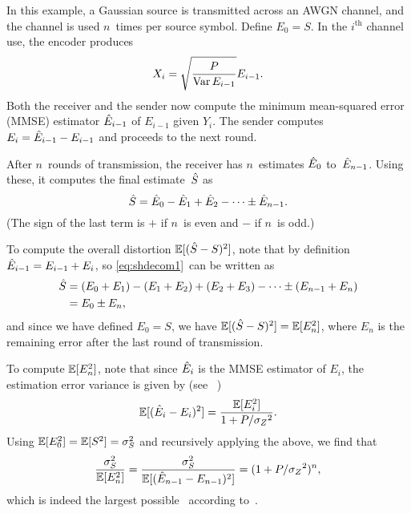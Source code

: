 \begin{example}
  \label{ex:gaussfb}
  In this example, a Gaussian source is transmitted across an AWGN channel, and
  the channel is used $n$~times per source symbol.  Define $E_0 = S$. In the
  $i^{\text{th}}$ channel use, the encoder produces
  \begin{equation}
    \label{eq:gaussfbxi}
    X_i = \sqrt{\frac{P}{\operatorname{Var} E_{i-1}}} E_{i-1}.
  \end{equation}
  Both the receiver and the sender now compute the minimum mean-squared
  error (MMSE) estimator $\hat{E}_{i-1}$ of $E_{i-1}$ given $Y_i$. The sender
  computes $E_i = \hat{E}_{i-1} - E_{i-1}$ and proceeds to the next round.

  After $n$~rounds of transmission, the receiver has $n$~estimates $\hat{E}_0$
  to~$\hat{E}_{n-1}$. Using these, it computes the final estimate~${\hat{S}}$ as
  \begin{equation}
    \label{eq:shdecom1}
    {\hat{S}} = \hat{E}_0 - \hat{E}_1 + \hat{E}_2 - \cdots \pm \hat{E}_{n-1}.
  \end{equation}
  (The sign of the last term is $+$ if $n$~is even and $-$ if $n$~is odd.)

  To compute the overall distortion ${\mathbb{E}[({\hat{S}} - S)^2]}$, note that by definition $\hat{E}_{i-1} =
  E_{i-1} + E_i$, so \eqref{eq:shdecom1}~can be written as
  \begin{align*}
    {\hat{S}} &= (E_0 + E_1) - (E_1 + E_2) + (E_2 + E_3) - \cdots \pm (E_{n-1} + E_n)
    \\
    &= E_0 \pm E_n,
  \end{align*}
  and since we have defined $E_0 = S$, we have ${\mathbb{E}[({\hat{S}} - S)^2]} = \mathbb{E}[E_n^2]$, where $E_n$
  is the remaining error after the last round of transmission.

  To compute $\mathbb{E}[E_n^2]$, note that since $\hat{E}_i$ is the MMSE estimator of
  $E_i$, the estimation error variance is given by (see
  \eg~\cite[Section~8.3]{Scharf1990})
  \begin{equation}
    \label{eq:gaussvardec}
    \mathbb{E}[(\hat{E}_i - E_i)^2] = \frac{\mathbb{E}[E_i^2]}{1 + P/{{\sigma_Z}^2}}.
  \end{equation}
  Using $\mathbb{E}[E_0^2] = \mathbb{E}[S^2] = {\sigma_S^2}$ and recursively applying the above, we find
  that
  \begin{equation*}
    \frac{{\sigma_S^2}}{\mathbb{E}[E_n^2]} = \frac{{\sigma_S^2}}{\mathbb{E}[(\hat{E}_{n-1} - E_{n-1})^2]} =
    (1 + P/{{\sigma_Z}^2})^n,
  \end{equation*}
  which is indeed the largest possible \sdr\ according
  to~.
\end{example}

